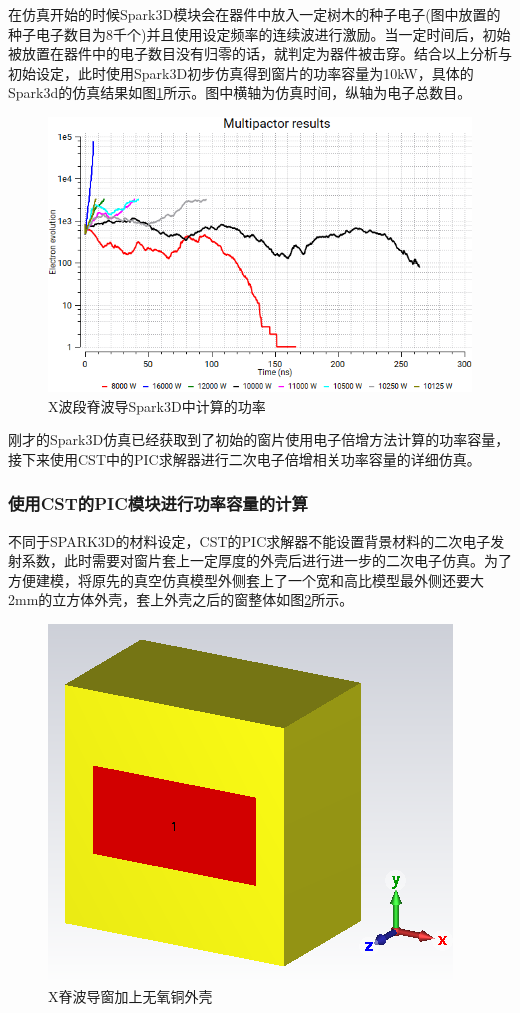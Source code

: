 \documentclass[master]{thesis-uestc}
\begin{document}
在仿真开始的时候Spark3D模块会在器件中放入一定树木的种子电子(图中放置的种子电子数目为8千个)并且使用设定频率的连续波进行激励。当一定时间后，初始被放置在器件中的电子数目没有归零的话，就判定为器件被击穿。结合以上分析与初始设定，此时使用Spark3D初步仿真得到窗片的功率容量为10kW，具体的Spark3d的仿真结果如图\ref{fig:X波段Spark3D中的功率}所示。图中横轴为仿真时间，纵轴为电子总数目。
\begin{figure}[!htb]
    \centering
    \includegraphics[width=0.5\linewidth]{pic/chapter3/X波段Spark3D中的功率.png}
    \caption{X波段脊波导Spark3D中计算的功率}
    \label{fig:X波段Spark3D中的功率}
\end{figure}

刚才的Spark3D仿真已经获取到了初始的窗片使用电子倍增方法计算的功率容量，接下来使用CST中的PIC求解器进行二次电子倍增相关功率容量的详细仿真。

\subsubsection{使用CST的PIC模块进行功率容量的计算}
不同于SPARK3D的材料设定，CST的PIC求解器不能设置背景材料的二次电子发射系数，此时需要对窗片套上一定厚度的外壳后进行进一步的二次电子仿真。为了方便建模，将原先的真空仿真模型外侧套上了一个宽和高比模型最外侧还要大2mm的立方体外壳，套上外壳之后的窗整体如图\ref{fig:X无氧铜外壳}所示。
\begin{figure}[!htb]
    \centering
    \includegraphics[width=0.4\linewidth]{pic/chapter3/X脊波导窗无氧铜外壳.png}
    \caption{X脊波导窗加上无氧铜外壳}
    \label{fig:X无氧铜外壳}
\end{figure}
\end{document}
